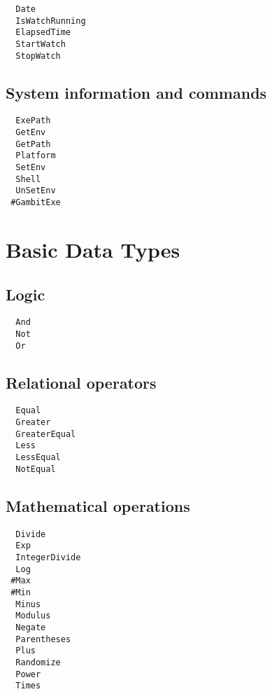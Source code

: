 \begin{multicols}{3}
\begin{verbatim}
  Date 
  IsWatchRunning 
  ElapsedTime 
  StartWatch 
  StopWatch 
\end{verbatim}
\end{multicols}

\subsection{System information and commands}

\begin{multicols}{3}
\begin{verbatim}
  ExePath 
  GetEnv 
  GetPath 
  Platform 
  SetEnv 
  Shell 
  UnSetEnv 
 #GambitExe 
\end{verbatim}
\end{multicols}

\section{Basic Data Types}

\subsection{Logic}

\begin{multicols}{3}
\begin{verbatim}
  And 
  Not 
  Or 
\end{verbatim}
\end{multicols}

\subsection{Relational operators}

\begin{multicols}{3}
\begin{verbatim}
  Equal 
  Greater 
  GreaterEqual 
  Less 
  LessEqual 
  NotEqual 
\end{verbatim}
\end{multicols}

\subsection{Mathematical operations}

\begin{multicols}{3}
\begin{verbatim}
  Divide 
  Exp 
  IntegerDivide 
  Log 
 #Max
 #Min
  Minus 
  Modulus 
  Negate 
  Parentheses 
  Plus 
  Randomize 
  Power 
  Times 
\end{verbatim}
\end{multicols}


